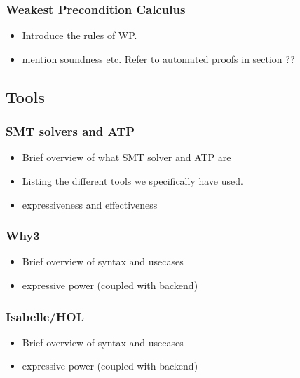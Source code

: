 \subsubsection{Weakest Precondition Calculus}\label{sec:wp}
\begin{itemize}
\item Introduce the rules of WP.
\item mention soundness etc. Refer to automated proofs in section ??
\end{itemize}

\subsection{Tools}

\subsubsection{SMT solvers and ATP}
\begin{itemize}
  \item Brief overview of what SMT solver and ATP are
  \item Listing the different tools we specifically have used.
  \item expressiveness and effectiveness
\end{itemize}

\subsubsection{Why3}\label{sec:why3}
\begin{itemize}
  \item Brief overview of syntax and usecases
  \item expressive power (coupled with backend)
\end{itemize}

\subsubsection{Isabelle/HOL}\label{sec:isabelle}
\begin{itemize}
  \item Brief overview of syntax and usecases
  \item expressive power (coupled with backend)
\end{itemize}
